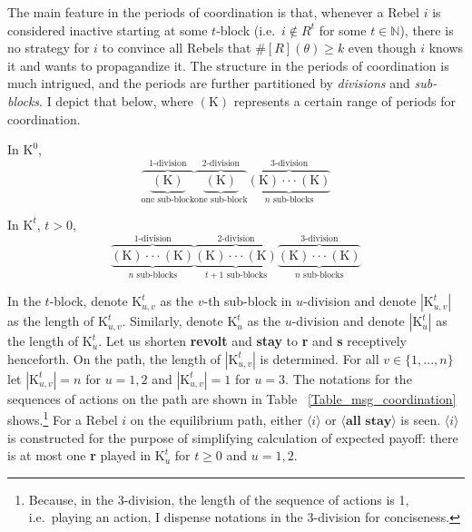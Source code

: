 \documentclass[12pt,letter]{article}
\newcommand{\Kappa}{\mathrm{K}}
\theoremstyle{definition}
\theoremstyle{remark}
\theoremstyle{claim}
\begin{document}
The main feature in the periods of coordination is that, whenever a Rebel $i$ is considered inactive starting at some $t$-block (i.e.~$i\notin R^t$ for some $t\in \mathbb{N}$), there is no strategy for $i$ to convince all Rebels that $\#[R](\theta)\geq k$ even though $i$ knows it and wants to propagandize it. The structure in the periods of coordination is much intrigued, and the periods are further partitioned by \textit{divisions} and \textit{sub-blocks}. I depict that below, where $(\Kappa)$ represents a certain range of periods for coordination. 



In $\Kappa^0$, 
\[\overbrace{\underbrace{( \Kappa) }_{\text{one sub-block}}}^{\text{$1$-division}} \overbrace{\underbrace{(\Kappa) }_{\text{one sub-block}}}^{\text{$2$-division}} \overbrace{\underbrace{(\Kappa) \cdot \cdot \cdot (\Kappa)}_{\text{$n$ sub-blocks}}}^{\text{$3$-division}}\] 

In $\Kappa^t$, $t>0$,
\[\overbrace{\underbrace{(\Kappa) \cdot \cdot \cdot (\Kappa)}_{\text{$n$ sub-blocks}}}^{\text{$1$-division}} \overbrace{\underbrace{(\Kappa) \cdot \cdot \cdot (\Kappa)}_{\text{$t+1$ sub-blocks}} }^{\text{$2$-division}} \overbrace{\underbrace{(\Kappa) \cdot \cdot \cdot (\Kappa)}_{\text{$n$ sub-blocks}}}^{\text{$3$-division}}\] 




In the $t$-block, denote $\Kappa^t_{u,v}$ as the $v$-th sub-block in $u$-division and denote $|\Kappa^t_{u,v} |$ as the length of $\Kappa^t_{u,v}$. Similarly, denote $\Kappa^t_{u}$ as the $u$-division and denote $|\Kappa^t_{u} |$ as the length of $\Kappa^t_{u}$. Let us shorten \textbf{revolt} and \textbf{stay} to \textbf{r} and \textbf{s} receptively henceforth. On the path, the length of $|\Kappa^t_{u,v}|$ is determined. For all $v\in \{1,...,n\}$ let $|\Kappa^t_{u,v}|=n$ for $u=1,2$ and $|\Kappa^t_{u,v}|=1$ for $u=3$. The notations for the sequences of actions on the path are shown in Table ~\ref{Table_msg_coordination} shows.\footnote{Because, in the $3$-division, the length of the sequence of actions is 1, i.e.~playing an action, I dispense notations in the $3$-division for conciseness.}
For a Rebel $i$ on the equilibrium path, either $\langle i \rangle$ or $\langle \textbf{all stay} \rangle$ is seen. $\langle i \rangle$ is constructed for the purpose of simplifying calculation of expected payoff: there is at most one \textbf{r} played in $\Kappa^t_u$ for $t\geq 0$ and $u=1,2$.    
\end{document}
